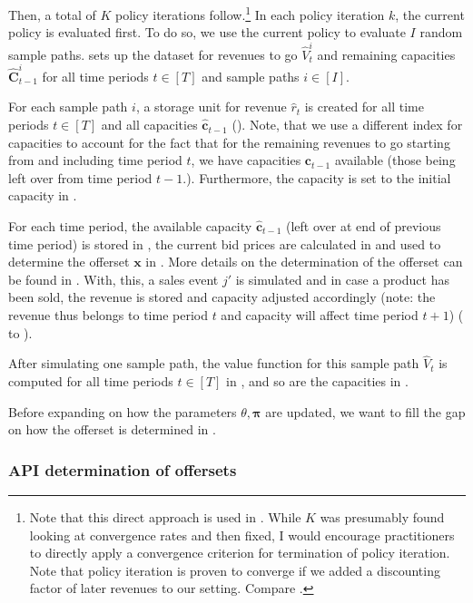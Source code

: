 Then, a total of $K$ policy iterations follow.\footnote{Note that this direct approach is used in \cite{Koch.2017}. While $K$ was presumably found looking at convergence rates and then fixed, I would encourage practitioners to directly apply a convergence criterion for termination of policy iteration. Note that policy iteration is proven to converge if we added a discounting factor of later revenues to our setting. Compare \cite[Proposition 1.3.6 on p. 48]{Bertsekas.2005}.} In each policy iteration $k$, the current policy is evaluated first. To do so, we use the current policy to evaluate $I$ random sample paths.  sets up the dataset for revenues to go $\hat{V}_t^i$ and remaining capacities $\boldsymbol{\hat{C}}_{t-1}^i$ for all time periods $t \in [T]$ and sample paths $i \in [I]$. 

For each sample path $i$, a storage unit for revenue $\hat{r}_t$ is created for all time periods $t \in [T]$ and all capacities $\boldsymbol{\hat{c}}_{t-1}$ (). Note, that we use a different index for capacities to account for the fact that for the remaining revenues to go starting from and including time period $t$, we have capacities $\boldsymbol{c}_{t-1}$ available (those being left over from time period $t-1$.). Furthermore, the capacity is set to the initial capacity in .

For each time period, the available capacity $\boldsymbol{\hat{c}}_{t-1}$ (left over at end of previous time period) is stored in , the current bid prices are calculated in  and used to determine the offerset $\boldsymbol{x}$ in . More details on the determination of the offerset can be found in . With, this, a sales event $j'$ is simulated and in case a product has been sold, the revenue is stored and capacity adjusted accordingly (note: the revenue thus belongs to time period $t$ and capacity will affect time period $t+1$) ( to ).

After simulating one sample path, the value function for this sample path $\hat{V}_t$ is computed for all time periods $t\in[T]$ in , and so are the capacities in .

Before expanding on how the parameters $\theta, \boldsymbol{\pi}$ are updated, we want to fill the gap on how the offerset is determined in .

\subsubsection{API determination of offersets}\label{sec-determineOfferset}

